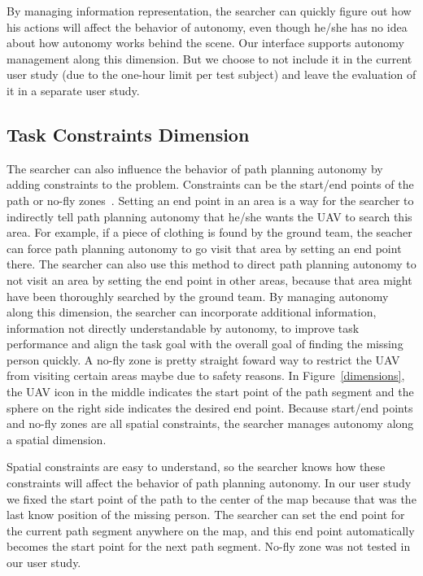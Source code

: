 \documentclass[journal]{IEEEtran}
\begin{document}
By managing information representation, the searcher can quickly figure out how his actions will affect the behavior of autonomy, even though he/she has no idea about how autonomy works behind the scene. Our interface supports autonomy management along this dimension. But we choose to not include it in the current user study (due to the one-hour limit per test subject) and leave the evaluation of it in a separate user study.

\subsection{Task Constraints Dimension}

The searcher can also influence the behavior of path planning autonomy by adding constraints to the problem. Constraints can be the start/end points of the path or no-fly zones~\cite{Clark2013Hierarchical}. Setting an end point in an area is a way for the searcher to indirectly tell path planning autonomy that he/she wants the UAV to search this area. For example, if a piece of clothing is found by the ground team, the seacher can force path planning autonomy to go visit that area by setting an end point there. The searcher can also use this method to direct path planning autonomy to not visit an area by setting the end point in other areas, because that area might have been thoroughly searched by the ground team. By managing autonomy along this dimension, the searcher can incorporate additional information, information not directly understandable by autonomy, to improve task performance and align the task goal with the overall goal of finding the missing person quickly. A no-fly zone is pretty straight foward way to restrict the UAV from visiting certain areas maybe due to safety reasons. In Figure~\ref{dimensions}, the UAV icon in the middle indicates the start point of the path segment and the sphere on the right side indicates the desired end point. Because start/end points and no-fly zones are all spatial constraints, the searcher manages autonomy along a spatial dimension.

Spatial constraints are easy to understand, so the searcher knows how these constraints will affect the behavior of path planning autonomy. In our user study we fixed the start point of the path to the center of the map because that was the last know position of the missing person. The searcher can set the end point for the current path segment anywhere on the map, and this end point automatically becomes the start point for the next path segment. No-fly zone was not tested in our user study.
\end{document}
